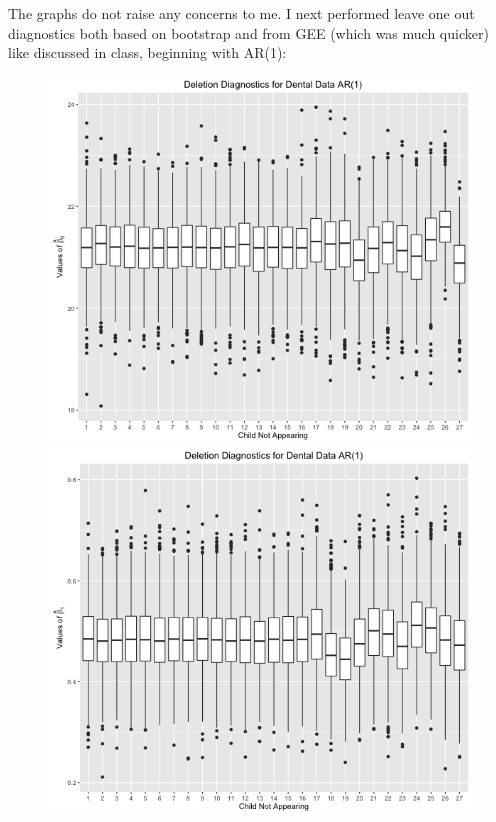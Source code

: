 \documentclass[11pt]{article}
\begin{document}
\begin{enumerate}
\begin{figure}[H]
		\end{figure}
		The graphs do not raise any concerns to me. I next performed leave one out diagnostics both based on bootstrap and from GEE (which was much quicker) like discussed in class, beginning with AR(1):
		\begin{figure}[H]
			\includegraphics[scale=0.4]{RplotDDAR1Beta0.png}
			\includegraphics[scale=0.4]{RplotDDAR1Beta1.png}

\end{figure}
\end{enumerate}
\end{document}
